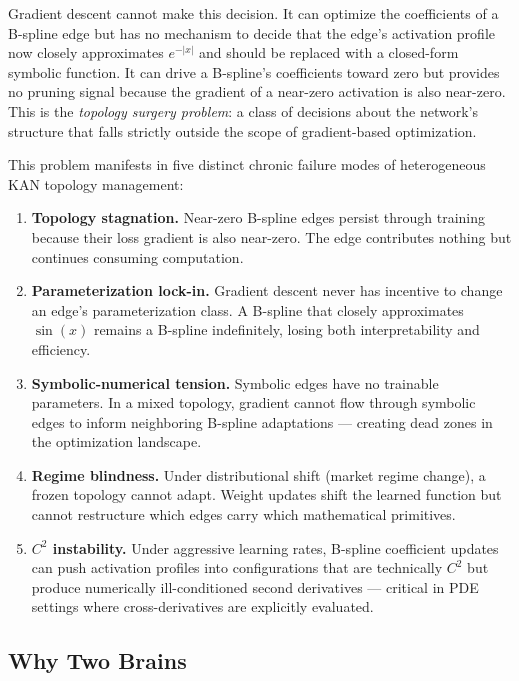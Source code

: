 \documentclass[11pt,a4paper]{article}
\begin{document}
Gradient descent cannot make this decision. It can optimize the coefficients of a
B-spline edge but has no mechanism to decide that the edge's activation profile now
closely approximates $e^{-|x|}$ and should be replaced with a closed-form symbolic
function. It can drive a B-spline's coefficients toward zero but provides no pruning
signal because the gradient of a near-zero activation is also near-zero. This is the
\emph{topology surgery problem}: a class of decisions about the network's structure
that falls strictly outside the scope of gradient-based optimization.

This problem manifests in five distinct chronic failure modes of heterogeneous KAN
topology management:

\begin{enumerate}[nosep]
  \item \textbf{Topology stagnation.} Near-zero B-spline edges persist through training
  because their loss gradient is also near-zero. The edge contributes nothing but
  continues consuming computation.

  \item \textbf{Parameterization lock-in.} Gradient descent never has incentive to
  change an edge's parameterization class. A B-spline that closely approximates
  $\sin(x)$ remains a B-spline indefinitely, losing both interpretability and
  efficiency.

  \item \textbf{Symbolic-numerical tension.} Symbolic edges have no trainable
  parameters. In a mixed topology, gradient cannot flow through symbolic edges to
  inform neighboring B-spline adaptations --- creating dead zones in the optimization
  landscape.

  \item \textbf{Regime blindness.} Under distributional shift (market regime change),
  a frozen topology cannot adapt. Weight updates shift the learned function but cannot
  restructure which edges carry which mathematical primitives.

  \item \textbf{$C^2$ instability.} Under aggressive learning rates, B-spline
  coefficient updates can push activation profiles into configurations that are
  technically $C^2$ but produce numerically ill-conditioned second derivatives ---
  critical in PDE settings where cross-derivatives are explicitly evaluated.
\end{enumerate}

\subsection{Why Two Brains}
\label{sec:intro:twobrains}
\end{document}
